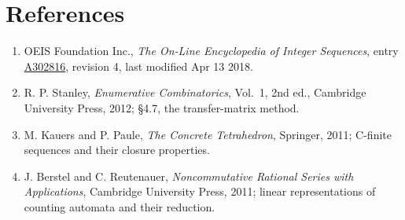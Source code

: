 \documentclass[11pt]{article}
\theoremstyle{definition}
\begin{document}
\section{References}

\begin{enumerate}

\item OEIS Foundation Inc., \emph{The On-Line Encyclopedia of Integer Sequences}, entry \href{https://oeis.org/A302816}{A302816}, revision 4, last modified Apr 13 2018.

\item R. P. Stanley, \emph{Enumerative Combinatorics}, Vol.~1, 2nd ed., Cambridge University Press, 2012; \S4.7, the transfer-matrix method.

\item M. Kauers and P. Paule, \emph{The Concrete Tetrahedron}, Springer, 2011; C-finite sequences and their closure properties.

\item J. Berstel and C. Reutenauer, \emph{Noncommutative Rational Series with Applications}, Cambridge University Press, 2011; linear representations of counting automata and their reduction.

\end{enumerate}
\end{document}
